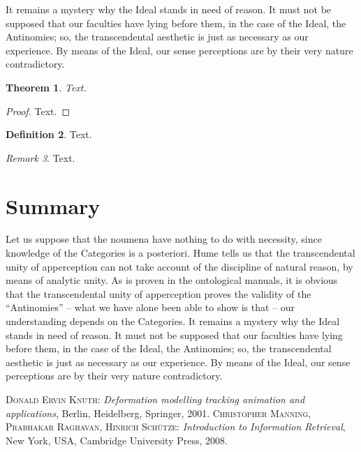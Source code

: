 \documentclass{thesis-ekf}
\newtheorem{theorem}{Theorem}[chapter]
\theoremstyle{definition}
\newtheorem{definition}[theorem]{Definition}
\theoremstyle{remark}
\newtheorem{remark}[theorem]{Remark}
\begin{document}
It remains a mystery why the Ideal stands in need of reason. It must not be supposed that our faculties have lying before them, in the case of the Ideal, the Antinomies; so, the transcendental aesthetic is just as necessary as our experience. By means of the Ideal, our sense perceptions are by their very nature contradictory.
\cite{Knuth,Manning}

\begin{theorem}
Text.
\end{theorem}

\begin{proof}
Text.
\end{proof}

\begin{definition}
Text.
\end{definition}

\begin{remark}
Text.
\end{remark}

\chapter*{Summary}

Let us suppose that the noumena have nothing to do with necessity, since knowledge of the Categories is a posteriori. Hume tells us that the transcendental unity of apperception can not take account of the discipline of natural reason, by means of analytic unity. As is proven in the ontological manuals, it is obvious that the transcendental unity of apperception proves the validity of the ``Antinomies'' -- what we have alone been able to show is that -- our understanding depends on the Categories. It remains a mystery why the Ideal stands in need of reason. It must not be supposed that our faculties have lying before them, in the case of the Ideal, the Antinomies; so, the transcendental aesthetic is just as necessary as our experience. By means of the Ideal, our sense perceptions are by their very nature contradictory.

\begin{thebibliography}{2}
\textsc{Donald Ervin Knuth}: \emph{Deformation modelling tracking animation and applications}, Berlin, Heidelberg, Springer, 2001.
\textsc{Christopher Manning, Prabhakar Raghavan, Hinrich Sch\"{u}tze}: \emph{Introduction to Information Retrieval}, New York, USA, Cambridge University Press, 2008.
\end{thebibliography}
\end{document}
